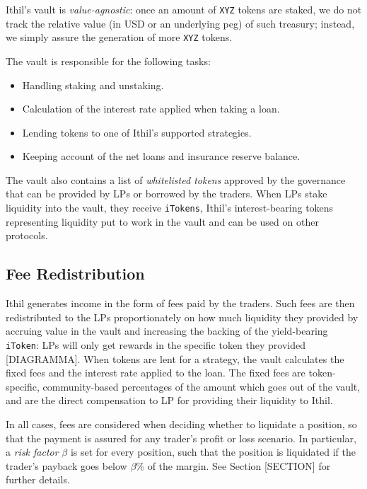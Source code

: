 \documentclass[a4paper,10 pt]{article}
\theoremstyle{definition}
\begin{document}
Ithil's vault is \textit{value-agnostic}: once an amount of \verb|XYZ| tokens are staked, we do not track the relative value (in USD or an underlying peg) of such treasury; instead, we simply assure the generation of more \verb|XYZ| tokens.

The vault is responsible for the following tasks:
\begin{itemize}
\item Handling staking and unstaking.
\item Calculation of the interest rate applied when taking a loan.
\item Lending tokens to one of Ithil's supported strategies.
\item Keeping account of the net loans and insurance reserve balance.
\end{itemize}

The vault also contains a list of {\it whitelisted tokens} approved by the governance that can be provided by LPs or borrowed by the traders. When LPs stake liquidity into the vault, they receive \verb|iTokens|, Ithil's interest-bearing tokens representing liquidity put to work in the vault and can be used on other protocols.

\subsection{Fee Redistribution}

Ithil generates income in the form of fees paid by the traders. Such fees are then redistributed to the LPs proportionately on how much liquidity they provided by accruing value in the vault and increasing the backing of the yield-bearing \verb|iToken|: LPs will only get rewards in the specific token they provided [DIAGRAMMA]. When tokens are lent for a strategy, the vault calculates the fixed fees and the interest rate applied to the loan. The fixed fees are token-specific, community-based percentages of the amount which goes out of the vault, and are the direct compensation to LP for providing their liquidity to Ithil. 

In all cases, fees are considered when deciding whether to liquidate a position, so that the payment is assured for any trader's profit or loss scenario. In particular, a \textit{risk factor} $\beta$ is set for every position, such that the position is liquidated if the trader's payback goes below $\beta$\% of the margin. See Section [SECTION] for further details.
\end{document}
